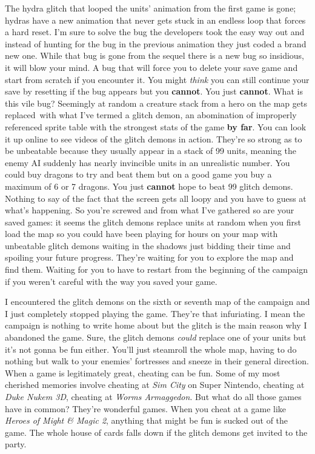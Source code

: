 \documentclass{book}
\begin{document}
The hydra glitch that looped the units’ animation from the first game is gone; hydras have a new animation that never gets stuck in an endless loop that forces a hard reset. I’m sure to solve the bug the developers took the easy way out and instead of hunting for the bug in the previous animation they just coded a brand new one. While that bug is gone from the sequel there is a new bug so insidious, it will blow your mind. A bug that will force you to delete your save game and start from scratch if you encounter it. You might \emph{think} you can still continue your save by resetting if the bug appears but you \textbf{cannot}. You just \textbf{cannot}. What is this vile bug? Seemingly at random a creature stack from a hero on the map gets replaced~with what I’ve termed a glitch demon, an abomination of improperly referenced sprite table with the strongest stats of the game \textbf{by far}. You can look it up online to see videos of the glitch demons in action. They’re so strong as to be unbeatable because they usually appear in a stack of 99 units, meaning the enemy AI suddenly has nearly invincible units in an unrealistic number. You could buy dragons to try and beat them but on a good game you buy a maximum of 6 or 7 dragons. You just \textbf{cannot} hope to beat 99 glitch demons. Nothing to say of the fact that the screen gets all loopy and you have to guess at what’s happening. So you’re screwed and from what I’ve gathered so are your saved games: it seems the glitch demons replace units at random when you first load the map so you could have been playing for hours on your map with unbeatable glitch demons waiting in the shadows just bidding their time and spoiling your future progress. They’re waiting for you to explore the map and find them. Waiting for you to have to restart from the beginning of the campaign if you weren’t careful with the way you saved your game.\par
I encountered the glitch demons on the sixth or seventh map of the campaign and I just completely stopped playing the game. They’re that infuriating. I mean the campaign is nothing to write home about but the glitch is the main reason why I abandoned the game. Sure, the glitch demons \emph{could} replace one of your units but it’s not gonna be fun either. You’ll just steamroll the whole map, having to do nothing but walk to your enemies’ fortresses and sneeze in their general direction. When a game is legitimately great, cheating can be fun. Some of my most cherished memories involve cheating at \emph{Sim City} on Super Nintendo, cheating at \emph{Duke Nukem 3D}, cheating at \emph{Worms Armaggedon}. But what do all those games have in common? They’re wonderful games. When you cheat at a game like \emph{Heroes of Might \& Magic 2}, anything that might be fun is sucked out of the game. The whole house of cards falls down if the glitch demons get invited to the party.\par
\end{document}
